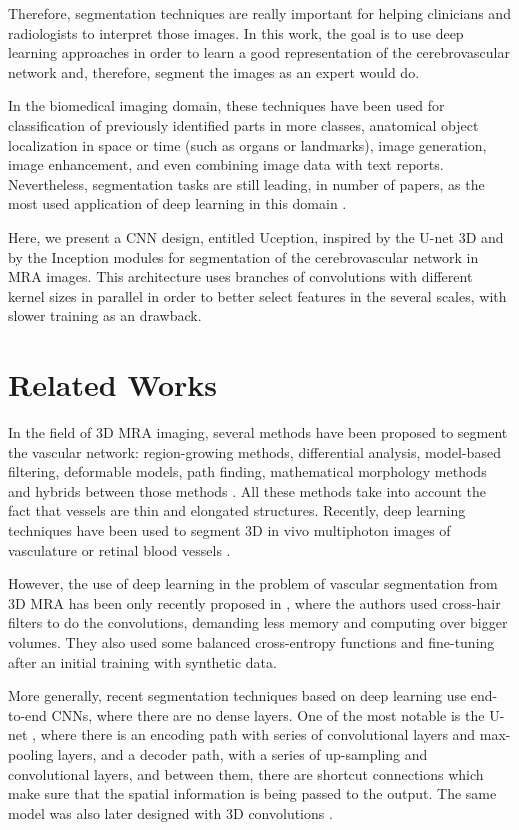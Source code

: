\documentclass{article}
\begin{document}
Therefore, segmentation techniques are really important for helping clinicians and radiologists to interpret those images. In this work, the goal is to use deep learning approaches in order to learn a good representation of the cerebrovascular network and, therefore, segment the images as an expert would do.

In the biomedical imaging domain, these techniques have been used for classification of previously identified parts in more classes, anatomical object localization in space or time (such as organs or landmarks), image generation, image enhancement, and even combining image data with text reports. Nevertheless, segmentation tasks are still leading, in number of papers, as the most used application of deep learning in this domain \cite{Litjens2017}.

Here, we present a CNN design, entitled Uception, inspired by the U-net 3D \cite{3Dunet} and by the Inception modules \cite{Szegedy2016} for segmentation of the cerebrovascular network in MRA images. This architecture uses branches of convolutions with different kernel sizes in parallel in order to better select features in the several scales, with slower training as an drawback.

\section{Related Works}
In the field of 3D MRA imaging, several methods have been proposed to segment the vascular network: region-growing methods, differential analysis, model-based filtering, deformable models, path finding, mathematical morphology methods and hybrids between those methods \cite{Tankyevych2011}. All these methods take into account the fact that vessels are thin and elongated structures. Recently, deep learning techniques have been used to segment 3D in vivo multiphoton images of vasculature \cite{Haft2018} or retinal blood vessels \cite{Liskowski2016}.

 

However, the use of deep learning in the problem of vascular segmentation from 3D MRA has been only recently proposed in \cite{Tetteh2018}, where the authors used cross-hair filters to do the convolutions, demanding less memory and computing over bigger volumes. They also used some balanced cross-entropy functions and fine-tuning after an initial training with synthetic data. 

More generally, recent segmentation techniques based on deep learning use end-to-end CNNs, where there are no dense layers. One of the most notable is the U-net \cite{Ronneberger2015}, where there is an encoding path with series of convolutional layers and max-pooling layers, and a decoder path, with a series of up-sampling and convolutional layers, and between them, there are shortcut connections which make sure that the spatial information is being passed to the output. The same model was also later designed with 3D convolutions \cite{3Dunet}. 
\end{document}
